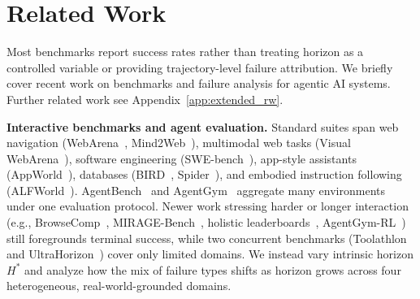 \documentclass[11pt]{article}
\begin{document}
\section{Related Work}

Most benchmarks report success rates rather than treating horizon as a controlled variable or providing trajectory-level failure attribution. We briefly cover recent work on benchmarks and failure analysis for agentic AI systems. Further related work see Appendix~\ref{app:extended_rw}.

\textbf{Interactive benchmarks and agent evaluation.}
Standard suites span web navigation (WebArena~\citep{zhou2023webarena}, Mind2Web~\citep{deng2023mind2web}), multimodal web tasks (Visual WebArena~\citep{koh2024visualwebarena}), software engineering (SWE-bench~\citep{jimenez2023swe}), app-style assistants (AppWorld~\citep{trivedi2024appworld}), databases (BIRD~\citep{li2023bird}, Spider~\citep{yu2018spider}), and embodied instruction following (ALFWorld~\citep{shridhar2020alfworld}). AgentBench~\citep{liu2023agentbench} and AgentGym~\citep{xi2023agentgym} aggregate many environments under one evaluation protocol.
Newer work stressing harder or longer interaction (e.g., BrowseComp~\citep{wei2025browsecomp}, MIRAGE-Bench~\citep{zhang2025mirage}, holistic leaderboards~\citep{kapoor2025holistic}, AgentGym-RL~\citep{xi2025agentgym}) still foregrounds terminal success, while two concurrent benchmarks (Toolathlon~\citep{luo2025ultrahorizonbenchmarkingagentcapabilities} and UltraHorizon~\citep{luo2025ultrahorizonbenchmarkingagentcapabilities}) cover only limited domains. We instead vary intrinsic horizon \(H^*\) and analyze how the mix of failure types shifts as horizon grows across four heterogeneous, real-world-grounded domains.

\end{document}
